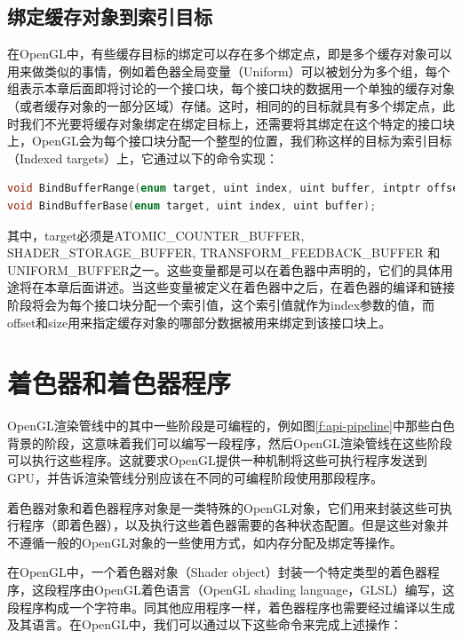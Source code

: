 \subsection{绑定缓存对象到索引目标}\label{sec:api-indexed-target}
在OpenGL中，有些缓存目标的绑定可以存在多个绑定点，即是多个缓存对象可以用来做类似的事情，例如着色器全局变量（Uniform）可以被划分为多个组，每个组表示本章后面即将讨论的一个接口块，每个接口块的数据用一个单独的缓存对象（或者缓存对象的一部分区域）存储。这时，相同的的目标就具有多个绑定点，此时我们不光要将缓存对象绑定在绑定目标上，还需要将其绑定在这个特定的接口块上，OpenGL会为每个接口块分配一个整型的位置，我们称这样的目标为索引目标（Indexed targets）上，它通过以下的命令实现：

\begin{lstlisting}[language=C++]
void BindBufferRange(enum target, uint index, uint buffer, intptr offset, sizeiptr size);
void BindBufferBase(enum target, uint index, uint buffer);
\end{lstlisting}

其中，target必须是ATOMIC\_COUNTER\_BUFFER, SHADER\_STORAGE\_BUFFER, TRANSFORM\_FEEDBACK\_BUFFER 和 UNIFORM\_BUFFER之一。这些变量都是可以在着色器中声明的，它们的具体用途将在本章后面讲述。当这些变量被定义在着色器中之后，在着色器的编译和链接阶段将会为每个接口块分配一个索引值，这个索引值就作为index参数的值，而offset和size用来指定缓存对象的哪部分数据被用来绑定到该接口块上。






\section{着色器和着色器程序}
OpenGL渲染管线中的其中一些阶段是可编程的，例如图\ref{f:api-pipeline}中那些白色背景的阶段，这意味着我们可以编写一段程序，然后OpenGL渲染管线在这些阶段可以执行这些程序。这就要求OpenGL提供一种机制将这些可执行程序发送到GPU，并告诉渲染管线分别应该在不同的可编程阶段使用那段程序。

着色器对象和着色器程序对象是一类特殊的OpenGL对象，它们用来封装这些可执行程序（即着色器），以及执行这些着色器需要的各种状态配置。但是这些对象并不遵循一般的OpenGL对象的一些使用方式，如内存分配及绑定等操作。

在OpenGL中，一个着色器对象（Shader object）封装一个特定类型的着色器程序，这段程序由OpenGL着色语言（OpenGL shading language，GLSL）\cite{b:TheOpenGLShadingLanguage}编写，这段程序构成一个字符串。同其他应用程序一样，着色器程序也需要经过编译以生成及其语言。在OpenGL中，我们可以通过以下这些命令来完成上述操作：

